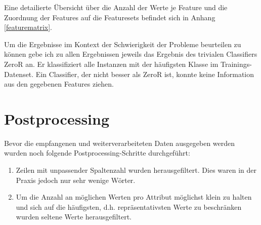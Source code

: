 Eine detailierte Übersicht über die Anzahl der Werte je Feature und die Zuordnung der Features auf die Featuresets befindet sich in Anhang \ref{featurematrix}. 

Um die Ergebnisse im Kontext der Schwierigkeit der Probleme beurteilen zu können gebe ich zu allen Ergebnissen jeweils das Ergebnis des trivialen Classifiers ZeroR an. Er klassifiziert alle Instanzen mit der häufigsten Klasse im Trainings-Datenset. Ein Classifier, der nicht besser als ZeroR ist, konnte keine Information aus den gegebenen Features ziehen.

\section{Postprocessing}
Bevor die empfangenen und weiterverarbeiteten Daten ausgegeben werden wurden noch folgende Postprocessing-Schritte durchgeführt:
\begin{enumerate}
\item Zeilen mit unpassender Spaltenzahl wurden herausgefiltert. Dies waren in der Praxis jedoch nur sehr wenige Wörter.
\item Um die Anzahl an möglichen Werten pro Attribut möglichst klein zu halten und sich auf die häufigsten, d.h. repräsentativsten Werte zu beschränken wurden seltene Werte herausgefiltert. 
\end{enumerate}

